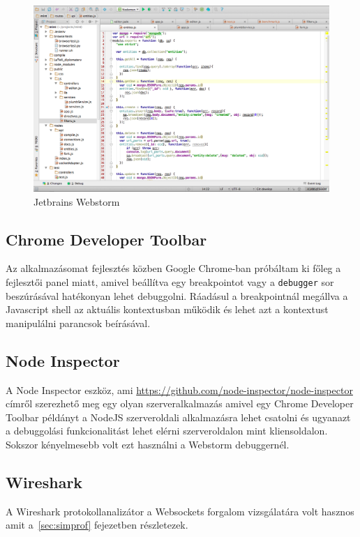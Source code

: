 \begin{figure}[!ht]
\centering
\includegraphics[width=15cm,keepaspectratio]{figures/webstorm.png}
\caption{Jetbrains Webstorm}
\label{fig:webstorm}
\end{figure}

\subsection{Chrome Developer Toolbar}

Az alkalmazásomat fejlesztés közben Google Chrome-ban próbáltam ki főleg a fejlesztői panel miatt, amivel beállítva egy breakpointot vagy a \lstinline{debugger} sor beszúrásával hatékonyan lehet debuggolni. Ráadásul a breakpointnál megállva a Javascript shell az aktuális kontextusban működik és lehet azt a kontextust manipulálni parancsok beírásával.


\subsection{Node Inspector}

A Node Inspector eszköz, ami \url{https://github.com/node-inspector/node-inspector} címről szerezhető meg egy olyan szerveralkalmazás amivel egy Chrome Developer Toolbar példányt a NodeJS szerveroldali alkalmazásra lehet csatolni és ugyanazt a debuggolási funkcionalitást lehet elérni szerveroldalon mint kliensoldalon. Sokszor kényelmesebb volt ezt használni a Webstorm debuggernél.

\subsection{Wireshark}

A Wireshark protokollanalizátor a Websockets forgalom vizsgálatára volt hasznos amit a~\ref{sec:simprof} fejezetben részletezek.

